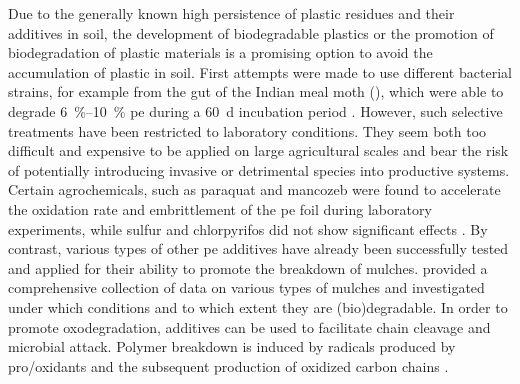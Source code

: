 Due to the generally known high persistence of plastic residues and their additives in soil, the development of biodegradable plastics or the promotion of biodegradation of plastic materials is a promising option to avoid the accumulation of plastic in soil. First attempts were made to use different bacterial strains, for example from the gut of the Indian meal moth (), which were able to degrade \SIrange{6}{10}{\percent} \ac{pe} during a \SI{60}{\day} incubation period \citep{HadadBiodegradation2005,KruegerProspects2015,YangPlastic2015}. However, such selective treatments have been restricted to laboratory conditions. They seem both too difficult and expensive to be applied on large agricultural scales and bear the risk of potentially introducing invasive or detrimental species into productive systems. Certain agrochemicals, such as paraquat and mancozeb were found to accelerate the oxidation rate and embrittlement of the \ac{pe} foil during laboratory experiments, while sulfur and chlorpyrifos did not show significant effects \citep{YehEffect2015}. By contrast, various types of other \ac{pe} additives have already been successfully tested and applied for their ability to promote the breakdown of mulches.  provided a comprehensive collection of data on various types of mulches and investigated under which conditions and to which extent they are (bio)degradable. In order to promote oxodegradation, additives can be used to facilitate chain cleavage and microbial attack. Polymer breakdown is induced by radicals produced by pro\-/oxidants and the subsequent production of oxidized carbon chains \citep{BriassoulisDegradation2015}.
